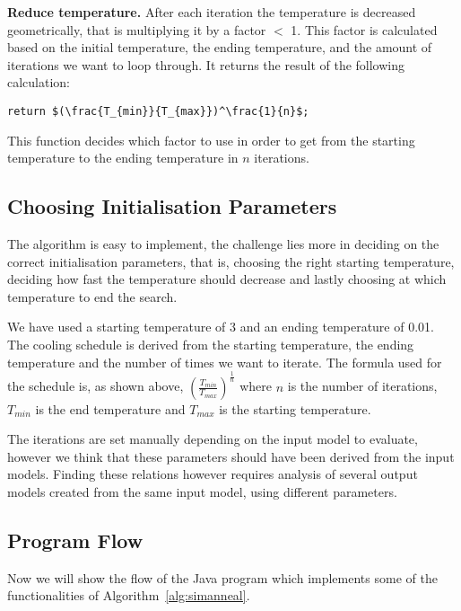 \documentclass[a4paper]{article}
\begin{document}
\begin{description}
\item{\textbf{Reduce temperature.}}
After each iteration the temperature is decreased geometrically, that is multiplying it by a factor $<$ 1.
This factor is calculated based on the initial temperature, the ending temperature, and the amount of iterations we want to loop through.
It returns the result of the following calculation:

\begin{lstlisting}[mathescape=true]
	return $(\frac{T_{min}}{T_{max}})^\frac{1}{n}$;
\end{lstlisting}

This function decides which factor to use in order to get from the starting temperature to the ending temperature in $n$ iterations.

\end{description}

\subsection{Choosing Initialisation Parameters}

The algorithm is easy to implement, the challenge lies more in deciding on the correct initialisation parameters, 
that is, choosing the right starting temperature, deciding how fast the temperature should decrease and lastly choosing at which temperature to end the search.

We have used a starting temperature of 3 and an ending temperature of 0.01.
The cooling schedule is derived from the starting temperature, the ending temperature and the number of times we want to iterate.
The formula used for the schedule is, as shown above,  $(\frac{T_{min}}{T_{max}})^\frac{1}{n}$ where $n$ is the number of iterations, $T_{min}$ is the end temperature and $T_{max}$ is the starting temperature.

The iterations are set manually depending on the input model to evaluate, however we think that these parameters should have been derived from the input models.
Finding these relations however requires analysis of several output models created from the same input model, using different parameters.


\subsection{Program Flow}\label{sec:program_flow}

Now we will show the flow of the Java program which implements some of the functionalities of Algorithm~\ref{alg:simanneal}.
\end{document}
